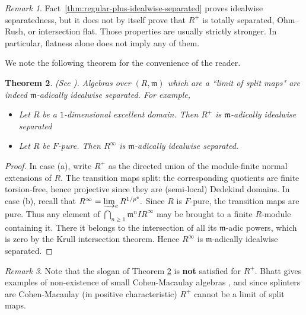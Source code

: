 \documentclass[12pt,reqno]{amsart}
\newtheorem{theorem}{Theorem}[section]
\theoremstyle{definition}
\theoremstyle{remark}
\newtheorem{remark}[theorem]{Remark}
\theoremstyle{cited}
\theoremstyle{remark}
\theoremstyle{citeddef}
\newcommand{\fm}{\mathfrak{m}}
\begin{document}
	\begin{remark}\label{rem:hh-does-not-give-total}
		Fact~\ref{thm:regular-plus-idealwise-separated} proves idealwise
		separatedness, but it does not by itself prove that $R^+$ is totally
		separated, Ohm--Rush, or intersection flat. Those properties are
		usually strictly stronger. In particular, flatness alone does not
		imply any of them.
	\end{remark}
	
	We note the following theorem for the convenience of the reader.
	
	\begin{theorem}\label{thm:pure-and-1dcase}(See \cite{Shravan}).
		Algebras over $(R,\mathfrak m)$ which are a ``limit of split maps" are indeed $\fm$-adically idealwise separated. For example, \begin{itemize}
			\item[(a)] Let $R$ be a $1$-dimensional excellent domain. Then $R^+$ is $\fm$-adically idealwise separated
			\item[(b)] Let $R$ be   $F$-pure. Then $R^{\infty}$ is $\fm$-adically idealwise separated.\end{itemize}
	\end{theorem}
	
	\begin{proof}
		In case {\rm (a)}, write $R^+$ as the directed union of the module-finite
		normal extensions of $R$. The transition maps split: the corresponding quotients are finite
		torsion-free, hence projective since they are (semi-local) Dedekind domains.
		In case {\rm (b)}, recall that
		\(
		R^\infty=\varinjlim_e R^{1/p^e}.
		\)
		Since $R$ is $F$-pure, the transition maps are pure.
		Thus any element of
		\(
		\bigcap_{n\geq 1}\mathfrak m^n IR^\infty
		\)
		may be brought to a finite $R$-module containing it. There
		it belongs to the intersection of all its $\mathfrak m$-adic powers, which
		is zero by the Krull intersection theorem. Hence $R^\infty$ is
		$\mathfrak m$-adically idealwise separated.
	\end{proof}
	
	
	
	
	\begin{remark}\label{rem:bhargavisawesome}
		Note that the slogan of Theorem \ref{thm:pure-and-1dcase} is \textbf{not} satisfied for $R^{+}$. Bhatt gives examples of non-existence of small Cohen-Macaulay algebras \cite{BhattSmallCM}, and since splinters are Cohen-Macaulay (in positive characteristic) $R^{+}$ cannot be a limit of split maps.
	\end{remark}
	
\end{document}
